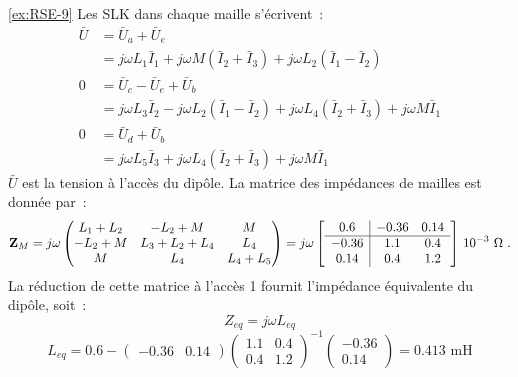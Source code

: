 \begin{solexercise}{\ref{ex:RSE-9}}
Les SLK dans chaque maille s'écrivent~: 
\begin{align*}
\bar{U}& = \bar{U}_a+\bar{U}_e\\
& =j\omega L_1\bar{I}_1+j\omega M (\bar{I}_2+\bar{I}_3)+j\omega L_2(\bar{I}_1-\bar{I}_2)\\
0& = \bar{U}_c-\bar{U}_e+\bar{U}_b\\
& = j\omega L_3\bar{I}_2-j\omega L_2(\bar{I}_1-\bar{I}_2)+j\omega L_4 (\bar{I}_2+\bar{I}_3)
+j\omega M \bar{I}_1\\
0 & =\bar{U}_d+\bar{U}_b\\
& = j\omega L_5\bar{I}_3+j\omega L_4(\bar{I}_2+\bar{I}_3)+j\omega M \bar{I}_1
\end{align*}
${\bar U}$ est la tension à l'accès du dipôle.
La matrice des impédances de mailles est donnée par~:
\[{\bf Z}_M=j\omega 
\begin{pmatrix}
L_1+L_2 & -L_2+M & M\\
-L_2+M & L_3+L_2+L_4 & L_4\\
M & L_4 & L_4+L_5
\end{pmatrix}=
j\omega \left[ \begin{array}{c|cc}
0.6 & -0.36 & 0.14\\ \hline
-0.36 & 1.1 & 0.4 \\
0.14 & 0.4 & 1.2
\end{array}\right]\, 10^{-3}\,\, \Omega ~.\]
La réduction de cette matrice à l'accès 1 fournit l'impédance
équivalente du dipôle, soit~:
\[Z_{eq}=j\omega L_{eq}\]
\[L_{eq} =
0.6-
\begin{pmatrix}
-0.36 & 0.14
\end{pmatrix}
\begin{pmatrix}
1.1 & 0.4\\
0.4 & 1.2
\end{pmatrix}^{-1}
\begin{pmatrix}
-0.36\\
0.14
\end{pmatrix}=0.413\text{~mH}\]

\end{solexercise}

